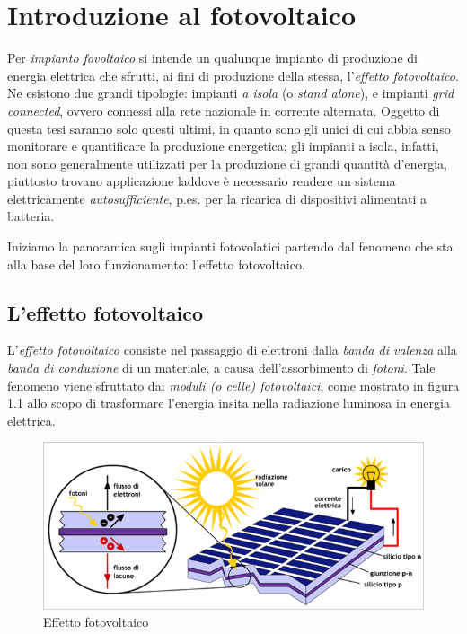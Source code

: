 \clearpage{\pagestyle{empty}\cleardoublepage}
\chapter{Introduzione al fotovoltaico}
%
Per \emph{impianto fovoltaico} si intende un qualunque 
impianto di produzione di energia elettrica che sfrutti, ai fini 
di produzione della stessa, l'\emph{effetto fotovoltaico}.
%
Ne esistono due grandi tipologie: impianti \emph{a isola} (o \emph{stand alone}), 
e impianti \emph{grid connected}, ovvero connessi alla rete nazionale in 
corrente alternata.
%
Oggetto di questa tesi saranno solo questi ultimi, in quanto sono gli unici
di cui abbia senso monitorare e quantificare la produzione energetica; gli impianti 
a isola, infatti, non sono generalmente utilizzati per la produzione di grandi
quantit\`a d'energia, piuttosto trovano applicazione laddove \`e necessario
rendere un sistema elettricamente \emph{autosufficiente}, p.es. per la 
ricarica di dispositivi alimentati a batteria.
%

%
Iniziamo la panoramica sugli impianti fotovolatici partendo dal fenomeno
che sta alla base del loro funzionamento: l'effetto fotovoltaico.
%

%
\section{L'effetto fotovoltaico}
L'\emph{effetto fotovoltaico} consiste nel passaggio di elettroni 
dalla \emph{banda di valenza} alla \emph{banda di conduzione} di 
un materiale, a causa dell'assorbimento di \emph{fotoni}. 
%
Tale fenomeno viene sfruttato dai \emph{moduli (o celle) fotovoltaici}, 
come mostrato in figura \ref{effetto-fv} allo scopo di trasformare 
l'energia insita nella radiazione luminosa in energia elettrica.
%
\begin{figure}[!h]
\centering
\includegraphics[width=350pt]{img/effetto-fovoltaico.png}
\caption{Effetto fotovoltaico}
\label{effetto-fv}
\end{figure}
%

